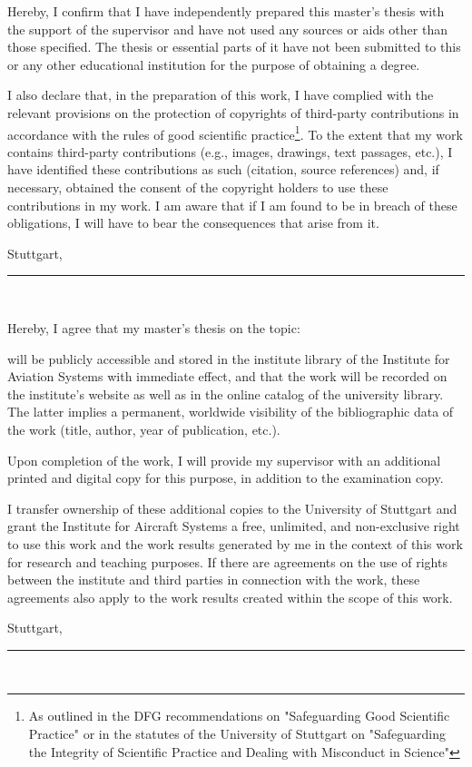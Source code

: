
Hereby, I confirm that I have independently prepared this master's thesis with the support of the supervisor
and have not used any sources or aids other than those specified.
The thesis or essential parts of it have not been submitted to this or any other educational institution for the purpose of obtaining a degree.

I also declare that, in the preparation of this work, I have complied with the relevant provisions on the protection of
copyrights of third-party contributions in accordance with the rules of good scientific
practice\footnote{As outlined in the DFG recommendations on "Safeguarding Good Scientific Practice" or in the statutes of the
University of Stuttgart on "Safeguarding the Integrity of Scientific Practice and Dealing with Misconduct in Science"}.
To the extent that my work contains third-party contributions (e.g., images, drawings, text passages, etc.),
I have identified these contributions as such (citation, source references) and, if necessary, obtained the consent of
the copyright holders to use these contributions in my work.
I am aware that if I am found to be in breach of these obligations, I will have to bear the consequences that arise from it.
\vspace{2cm}

Stuttgart, \thedate \hfill \rule{8cm}{0.4pt} \linebreak
\mbox{~} \hfill	\theauthor


Hereby, I agree that my master's thesis on the topic:
\begin{center}
	\textit{\thetitle}
\end{center}
will be publicly accessible and stored in the institute library of the Institute for Aviation Systems with immediate effect,
and that the work will be recorded on the institute's website as well as in the online catalog of the university library.
The latter implies a permanent, worldwide visibility of the bibliographic data of the work (title, author, year of publication, etc.).

Upon completion of the work, I will provide my supervisor with an additional printed and digital copy for this purpose, in addition to the examination copy.

I transfer ownership of these additional copies to the University of Stuttgart and grant the Institute for Aircraft Systems a free,
unlimited, and non-exclusive right to use this work and the work results generated by me in the context of this work for research and teaching purposes.
If there are agreements on the use of rights between the institute and third parties in connection with the work,
these agreements also apply to the work results created within the scope of this work.
\vspace{2cm}

Stuttgart, \thedate \hfill \rule{8cm}{0.4pt} \linebreak
\mbox{~} \hfill	\theauthor





